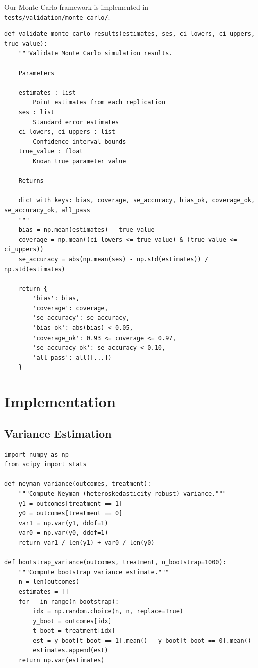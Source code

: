 Our Monte Carlo framework is implemented in \texttt{tests/validation/monte\_carlo/}:

\begin{verbatim}
def validate_monte_carlo_results(estimates, ses, ci_lowers, ci_uppers, true_value):
    """Validate Monte Carlo simulation results.

    Parameters
    ----------
    estimates : list
        Point estimates from each replication
    ses : list
        Standard error estimates
    ci_lowers, ci_uppers : list
        Confidence interval bounds
    true_value : float
        Known true parameter value

    Returns
    -------
    dict with keys: bias, coverage, se_accuracy, bias_ok, coverage_ok, se_accuracy_ok, all_pass
    """
    bias = np.mean(estimates) - true_value
    coverage = np.mean((ci_lowers <= true_value) & (true_value <= ci_uppers))
    se_accuracy = abs(np.mean(ses) - np.std(estimates)) / np.std(estimates)

    return {
        'bias': bias,
        'coverage': coverage,
        'se_accuracy': se_accuracy,
        'bias_ok': abs(bias) < 0.05,
        'coverage_ok': 0.93 <= coverage <= 0.97,
        'se_accuracy_ok': se_accuracy < 0.10,
        'all_pass': all([...])
    }
\end{verbatim}


\section{Implementation}
\label{sec:inference_implementation}

\subsection{Variance Estimation}

\begin{verbatim}
import numpy as np
from scipy import stats

def neyman_variance(outcomes, treatment):
    """Compute Neyman (heteroskedasticity-robust) variance."""
    y1 = outcomes[treatment == 1]
    y0 = outcomes[treatment == 0]
    var1 = np.var(y1, ddof=1)
    var0 = np.var(y0, ddof=1)
    return var1 / len(y1) + var0 / len(y0)

def bootstrap_variance(outcomes, treatment, n_bootstrap=1000):
    """Compute bootstrap variance estimate."""
    n = len(outcomes)
    estimates = []
    for _ in range(n_bootstrap):
        idx = np.random.choice(n, n, replace=True)
        y_boot = outcomes[idx]
        t_boot = treatment[idx]
        est = y_boot[t_boot == 1].mean() - y_boot[t_boot == 0].mean()
        estimates.append(est)
    return np.var(estimates)
\end{verbatim}


